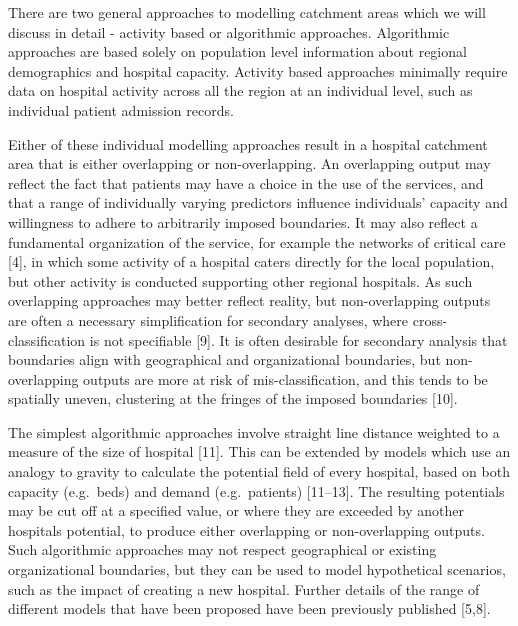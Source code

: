 \documentclass[
]{article}
\begin{document}
There are two general approaches to modelling catchment areas which we
will discuss in detail - activity based or algorithmic approaches.
Algorithmic approaches are based solely on population level information
about regional demographics and hospital capacity. Activity based
approaches minimally require data on hospital activity across all the
region at an individual level, such as individual patient admission
records.

Either of these individual modelling approaches result in a hospital
catchment area that is either overlapping or non-overlapping. An
overlapping output may reflect the fact that patients may have a choice
in the use of the services, and that a range of individually varying
predictors influence individuals' capacity and willingness to adhere to
arbitrarily imposed boundaries. It may also reflect a fundamental
organization of the service, for example the networks of critical care
{[}4{]}, in which some activity of a hospital caters directly for the
local population, but other activity is conducted supporting other
regional hospitals. As such overlapping approaches may better reflect
reality, but non-overlapping outputs are often a necessary
simplification for secondary analyses, where cross-classification is not
specifiable {[}9{]}. It is often desirable for secondary analysis that
boundaries align with geographical and organizational boundaries, but
non-overlapping outputs are more at risk of mis-classification, and this
tends to be spatially uneven, clustering at the fringes of the imposed
boundaries {[}10{]}.

The simplest algorithmic approaches involve straight line distance
weighted to a measure of the size of hospital {[}11{]}. This can be
extended by models which use an analogy to gravity to calculate the
potential field of every hospital, based on both capacity (e.g.~beds)
and demand (e.g.~patients) {[}11--13{]}. The resulting potentials may be
cut off at a specified value, or where they are exceeded by another
hospitals potential, to produce either overlapping or non-overlapping
outputs. Such algorithmic approaches may not respect geographical or
existing organizational boundaries, but they can be used to model
hypothetical scenarios, such as the impact of creating a new hospital.
Further details of the range of different models that have been proposed
have been previously published {[}5,8{]}.
\end{document}
